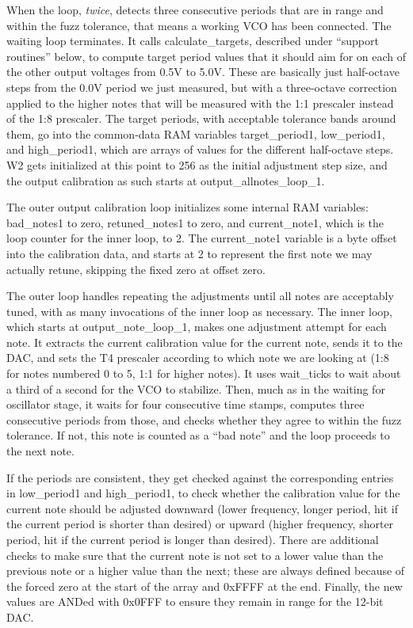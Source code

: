 When the loop, \emph{twice}, detects three consecutive periods that are in
range and within the fuzz tolerance, that means a working VCO has been
connected.  The waiting loop terminates.  It calls calculate\_targets,
described under ``support routines'' below, to compute target period values
that it should aim for on each of the other output voltages from 0.5V to
5.0V.  These are basically just half-octave steps from the 0.0V period we
just measured, but with a three-octave correction applied to the higher
notes that will be measured with the 1:1 prescaler instead of the 1:8
prescaler.  The target periods, with acceptable tolerance bands around them,
go into the common-data RAM variables target\_period1, low\_period1, and
high\_period1, which are arrays of values for the different half-octave
steps.  W2 gets initialized at this point to 256 as the initial adjustment
step size, and the output calibration as such starts at
output\_allnotes\_loop\_1.

The outer output calibration loop initializes some internal RAM variables:
bad\_notes1 to zero, retuned\_notes1 to zero, and current\_note1, which is
the loop counter for the inner loop, to 2.  The current\_note1 variable
is a byte offset into the calibration data, and starts at 2 to represent the
first note we may actually retune, skipping the fixed zero at offset zero.

The outer loop handles repeating the adjustments until all notes are
acceptably tuned, with as many invocations of the inner loop as necessary. 
The inner loop, which starts at output\_note\_loop\_1, makes one adjustment
attempt for each note.  It extracts the current calibration value for the
current note, sends it to the DAC, and sets the T4 prescaler according to
which note we are looking at (1:8 for notes numbered 0 to 5, 1:1 for higher
notes).  It uses wait\_ticks to wait about a third of a second for the VCO to
stabilize.  Then, much as in the waiting for oscillator stage, it waits for
four consecutive time stamps, computes three consecutive periods from those,
and checks whether they agree to within the fuzz tolerance.  If not, this
note is counted as a ``bad note'' and the loop proceeds to the next note.

If the periods are consistent, they get checked against the corresponding
entries in low\_period1 and high\_period1, to check whether the calibration
value for the current note should be adjusted downward (lower frequency,
longer period, hit if the current period is shorter than desired) or upward
(higher frequency, shorter period, hit if the current period is longer than
desired).  There are additional checks to make sure that the current note is
not set to a lower value than the previous note or a higher value than the
next; these are always defined because of the forced zero at the start of
the array and 0xFFFF at the end.  Finally, the new values are ANDed with
0x0FFF to ensure they remain in range for the 12-bit DAC.


